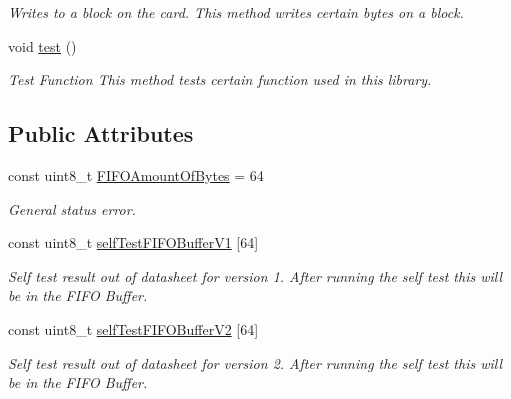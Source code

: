 \begin{DoxyCompactItemize}
\begin{DoxyCompactList}\small\item\em Writes to a block on the card.  This method writes certain bytes on a block. \end{DoxyCompactList}\item 
\mbox{\label{classMFRC522_a83fd02f159c77b1f6003ae9816337a1b}} 
void \hyperlink{classMFRC522_a83fd02f159c77b1f6003ae9816337a1b}{test} ()
\begin{DoxyCompactList}\small\item\em Test Function  This method tests certain function used in this library. \end{DoxyCompactList}\end{DoxyCompactItemize}
\subsection*{Public Attributes}
\begin{DoxyCompactItemize}
\item 
const uint8\+\_\+t \hyperlink{classMFRC522_a56c8309a003cf1a5d8479c7783826f8e}{F\+I\+F\+O\+Amount\+Of\+Bytes} = 64
\begin{DoxyCompactList}\small\item\em General status error. \end{DoxyCompactList}\item 
const uint8\+\_\+t \hyperlink{classMFRC522_a7d19c9869a7fbbe0d9825d5653d6af7b}{self\+Test\+F\+I\+F\+O\+Buffer\+V1} \mbox{[}64\mbox{]}
\begin{DoxyCompactList}\small\item\em Self test result out of datasheet for version 1. After running the self test this will be in the F\+I\+FO Buffer. \end{DoxyCompactList}\item 
const uint8\+\_\+t \hyperlink{classMFRC522_a6973b73a8a922ac09b9d89489bdbc333}{self\+Test\+F\+I\+F\+O\+Buffer\+V2} \mbox{[}64\mbox{]}
\begin{DoxyCompactList}\small\item\em Self test result out of datasheet for version 2. After running the self test this will be in the F\+I\+FO Buffer. \end{DoxyCompactList}\end{DoxyCompactItemize}
